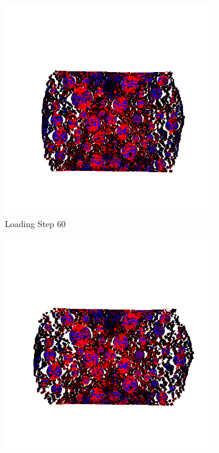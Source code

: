 \begin{figure}[ht]
    \begin{subfigure}{.33\textwidth}
      \centering
      \includegraphics[width=1.0\linewidth]{Files/A30P75_3_IS/DEP50-STEP(080).png}
      \caption{Loading Step 60}
    \end{subfigure}%
    \begin{subfigure}{.33\textwidth}
      \centering
      \includegraphics[width=1.0\linewidth]{Files/A30P75_3_IS/DEP50-STEP(100).png}

\end{subfigure}
\end{figure}
